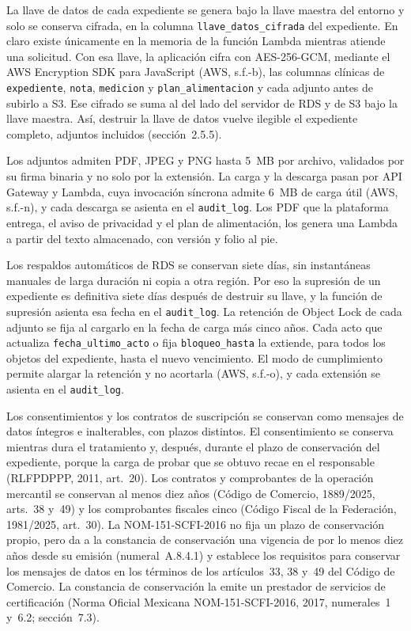 \documentclass[12pt, a4paper]{article}
\begin{document}
La llave de datos de cada expediente se genera bajo la llave maestra del
entorno y solo se conserva cifrada, en la columna
\texttt{llave\_datos\_cifrada} del expediente. En claro existe
únicamente en la memoria de la función Lambda mientras atiende una
solicitud. Con esa llave, la aplicación cifra con AES-256-GCM, mediante
el AWS Encryption SDK para JavaScript (AWS, s.f.-b), las columnas
clínicas de \texttt{expediente}, \texttt{nota}, \texttt{medicion} y
\texttt{plan\_alimentacion} y cada adjunto antes de subirlo a S3. Ese
cifrado se suma al del lado del servidor de RDS y de S3 bajo la llave
maestra. Así, destruir la llave de datos vuelve ilegible el expediente
completo, adjuntos incluidos (sección~2.5.5).

Los adjuntos admiten PDF, JPEG y PNG hasta 5~MB por archivo, validados
por su firma binaria y no solo por la extensión. La carga y la descarga
pasan por API Gateway y Lambda, cuya invocación síncrona admite 6~MB de
carga útil (AWS, s.f.-n), y cada descarga se asienta en el
\texttt{audit\_log}. Los PDF que la plataforma entrega, el aviso de
privacidad y el plan de alimentación, los genera una Lambda a partir del
texto almacenado, con versión y folio al pie.

Los respaldos automáticos de RDS se conservan siete días, sin
instantáneas manuales de larga duración ni copia a otra región. Por eso
la supresión de un expediente es definitiva siete días después de
destruir su llave, y la función de supresión asienta esa fecha en el
\texttt{audit\_log}. La retención de Object Lock de cada adjunto se fija
al cargarlo en la fecha de carga más cinco años. Cada acto que actualiza
\texttt{fecha\_ultimo\_acto} o fija \texttt{bloqueo\_hasta} la extiende,
para todos los objetos del expediente, hasta el nuevo vencimiento. El
modo de cumplimiento permite alargar la retención y no acortarla (AWS,
s.f.-o), y cada extensión se asienta en el \texttt{audit\_log}.

Los consentimientos y los contratos de suscripción se conservan como
mensajes de datos íntegros e inalterables, con plazos distintos. El
consentimiento se conserva mientras dura el tratamiento y, después,
durante el plazo de conservación del expediente, porque la carga de
probar que se obtuvo recae en el responsable (RLFPDPPP, 2011, art.~20).
Los contratos y comprobantes de la operación mercantil se conservan al
menos diez años (Código de Comercio, 1889/2025, arts.~38 y~49) y los
comprobantes fiscales cinco (Código Fiscal de la Federación, 1981/2025,
art.~30). La NOM-151-SCFI-2016 no fija un plazo de conservación propio,
pero da a la constancia de conservación una vigencia de por lo menos
diez años desde su emisión (numeral~A.8.4.1) y establece los requisitos
para conservar los mensajes de datos en los términos de los
artículos~33, 38 y~49 del Código de Comercio. La constancia de
conservación la emite un prestador de servicios de certificación (Norma
Oficial Mexicana NOM-151-SCFI-2016, 2017, numerales~1 y~6.2;
sección~7.3).
\end{document}
